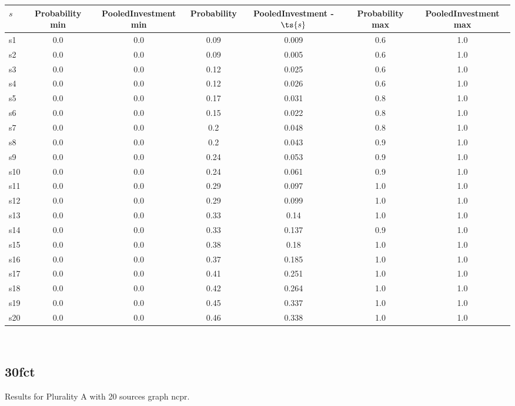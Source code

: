 \documentclass{article}
\begin{document}
\noindent\begin{tabular}{|l|c|c|c|c|c|c|}
\hline
$s$& Probability min & PooledInvestment min & Probability & PooledInvestment - $\ts{s}$ & Probability max & PooledInvestment max\\
\hline
s1 &0.0 & 0.0 & 0.09 & 0.009 & 0.6 & 1.0\\
\hline
s2 &0.0 & 0.0 & 0.09 & 0.005 & 0.6 & 1.0\\
\hline
s3 &0.0 & 0.0 & 0.12 & 0.025 & 0.6 & 1.0\\
\hline
s4 &0.0 & 0.0 & 0.12 & 0.026 & 0.6 & 1.0\\
\hline
s5 &0.0 & 0.0 & 0.17 & 0.031 & 0.8 & 1.0\\
\hline
s6 &0.0 & 0.0 & 0.15 & 0.022 & 0.8 & 1.0\\
\hline
s7 &0.0 & 0.0 & 0.2 & 0.048 & 0.8 & 1.0\\
\hline
s8 &0.0 & 0.0 & 0.2 & 0.043 & 0.9 & 1.0\\
\hline
s9 &0.0 & 0.0 & 0.24 & 0.053 & 0.9 & 1.0\\
\hline
s10 &0.0 & 0.0 & 0.24 & 0.061 & 0.9 & 1.0\\
\hline
s11 &0.0 & 0.0 & 0.29 & 0.097 & 1.0 & 1.0\\
\hline
s12 &0.0 & 0.0 & 0.29 & 0.099 & 1.0 & 1.0\\
\hline
s13 &0.0 & 0.0 & 0.33 & 0.14 & 1.0 & 1.0\\
\hline
s14 &0.0 & 0.0 & 0.33 & 0.137 & 0.9 & 1.0\\
\hline
s15 &0.0 & 0.0 & 0.38 & 0.18 & 1.0 & 1.0\\
\hline
s16 &0.0 & 0.0 & 0.37 & 0.185 & 1.0 & 1.0\\
\hline
s17 &0.0 & 0.0 & 0.41 & 0.251 & 1.0 & 1.0\\
\hline
s18 &0.0 & 0.0 & 0.42 & 0.264 & 1.0 & 1.0\\
\hline
s19 &0.0 & 0.0 & 0.45 & 0.337 & 1.0 & 1.0\\
\hline
s20 &0.0 & 0.0 & 0.46 & 0.338 & 1.0 & 1.0\\
\hline
\end{tabular}\\

\newpage

\subsection{30fct}

\noindent Results for Plurality A with 20 sources graph ncpr.
\end{document}
